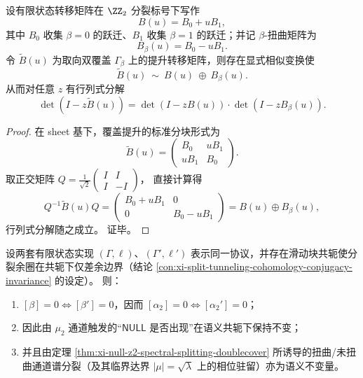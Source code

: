 \begin{theorem}\label{thm:xi-null-z2-spectral-splitting-doublecover}
设有限状态转移矩阵在 \(\ZZ_2\) 分裂标号下写作
\[
B(u)=B_0+uB_1,
\]
其中 \(B_0\) 收集 \(\beta=0\) 的跃迁、\(B_1\) 收集 \(\beta=1\) 的跃迁；并记 \(\beta\)-扭曲矩阵为
\[
B_\beta(u)=B_0-uB_1.
\]
令 \(\widetilde B(u)\) 为取向双覆盖 \(\Gamma_\beta\) 上的提升转移矩阵，则存在显式相似变换使
\[
\widetilde B(u)\ \sim\ B(u)\ \oplus\ B_\beta(u).
\]
从而对任意 \(z\) 有行列式分解
\[
\det(I-z\widetilde B(u))=\det(I-zB(u))\cdot \det(I-zB_\beta(u)).
\]
\end{theorem}

\begin{proof}
在 sheet 基下，覆盖提升的标准分块形式为
\[
\widetilde B(u)=
\begin{pmatrix}
B_0 & uB_1\\
uB_1 & B_0
\end{pmatrix}.
\]
取正交矩阵
\(
Q=\frac1{\sqrt2}\begin{pmatrix}I&I\\ I&-I\end{pmatrix}
\)，
直接计算得
\[
Q^{-1}\widetilde B(u)Q=
\begin{pmatrix}
B_0+uB_1 & 0\\
0 & B_0-uB_1
\end{pmatrix}
=B(u)\oplus B_\beta(u),
\]
行列式分解随之成立。
证毕。
\end{proof}

\begin{theorem}\label{thm:xi-null-z2-conjugacy-rigidity}
设两套有限状态实现 \((\Gamma,\ell)\)、\((\Gamma',\ell')\) 表示同一协议，并存在滑动块共轭使分裂余圈在共轭下仅差余边界（结论 \ref{con:xi-split-tunneling-cohomology-conjugacy-invariance} 的设定）。
则：
\begin{enumerate}
  \item \([\beta]=0 \iff [\beta']=0\)，因而 \([\alpha_2]=0 \iff [\alpha_2'] =0\)；
  \item 因此由 \(\mu_2\) 通道触发的“\(\mathsf{NULL}\) 是否出现”在语义共轭下保持不变；
  \item 并且由定理 \ref{thm:xi-null-z2-spectral-splitting-doublecover} 所诱导的扭曲/未扭曲通道谱分裂（及其临界达界 \(|\mu|=\sqrt{\lambda}\) 上的相位驻留）亦为语义不变量。
\end{enumerate}
\end{theorem}

